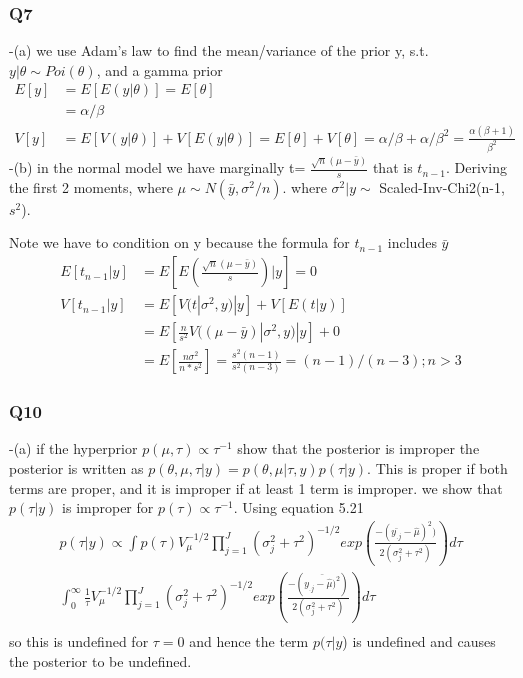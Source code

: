 \documentclass[
]{book}
\theoremstyle{definition}
\theoremstyle{definition}
\theoremstyle{definition}
\theoremstyle{definition}
\theoremstyle{remark}
\begin{document}
\hypertarget{q7}{%
\subsubsection*{Q7}\label{q7}}

-(a) we use Adam's law to find the mean/variance of the prior y, s.t. \(y|\theta \sim Poi(\theta)\), and a gamma prior
\[
\begin{aligned}
E[y] &= E[E(y|\theta)] = E[\theta] \\
     &= \alpha/\beta \\
V[y] &= E[V(y|\theta)] + V[E(y|\theta)] = E[\theta] + V[\theta] = \alpha/\beta + \alpha/\beta^2 = \frac{\alpha(\beta+1)}{\beta^2}     
\end{aligned}
\]
-(b) in the normal model we have marginally t= \(\frac{\sqrt{n}(\mu-\bar{y})}{s}\) that is \(t_{n-1}\). Deriving the first 2 moments, where \(\mu \sim N(\bar{y},\sigma^2/n)\). where \(\sigma^2 | y \sim\) Scaled-Inv-Chi2(n-1,\(s^2\)).

Note we have to condition on y because the formula for \(t_{n-1}\) includes \(\bar{y}\)
\[
\begin{aligned}
E[t_{n-1} | y] &= E[E(\frac{\sqrt{n}(\mu-\bar{y})}{s}) |y] = 0 \\
V[t_{n-1} | y] &= E[V(t|\sigma^2,y) |y] +V[ E(t|y)] \\
&= E[\frac{n}{s^2}V((\mu-\bar{y})|\sigma^2,y)|y] +0 \\
&= E[\frac{n\sigma^2}{n*s^2}] = \frac{s^2(n-1)}{s^2(n-3)}=(n-1)/(n-3) ; n >3
\end{aligned}
\]

\hypertarget{q10}{%
\subsubsection*{Q10}\label{q10}}

-(a) if the hyperprior \(p(\mu,\tau)\propto \tau^{-1}\) show that the posterior is improper
the posterior is written as \(p(\theta,\mu,\tau | y) = p(\theta,\mu | \tau, y)p(\tau|y)\). This is proper if both terms are proper, and it is improper if at least 1 term is improper.
we show that \(p(\tau | y)\) is improper for \(p(\tau)\propto \tau^{-1}\). Using equation 5.21
\[
\begin{aligned}
p(\tau|y) \propto \int p(\tau)V_{\mu}^{-1/2}\prod_{j=1}^J(\sigma_j^2+\tau^2)^{-1/2}exp(\frac{-(\bar{y_{.j}}-\hat{\mu})^2)}{2(\sigma_j^2+\tau^2)})d\tau \\
\int_{0}^{\infty} \frac{1}{\tau}V_{\mu}^{-1/2}\prod_{j=1}^J(\sigma_j^2+\tau^2)^{-1/2}exp(\frac{-(\bar{y_{.j}-\hat{\mu})^2})}{2(\sigma_j^2+\tau^2)})d\tau \\
\end{aligned}
\]
so this is undefined for \(\tau=0\) and hence the term \(p(\tau|y\)) is undefined and causes the posterior to be undefined.
\end{document}
